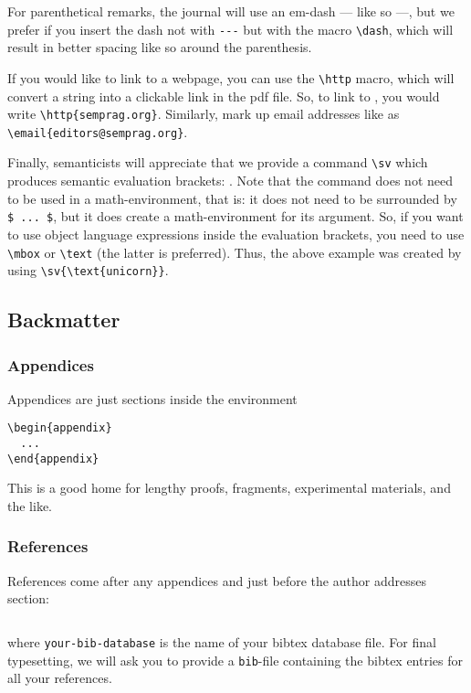 \documentclass[lucida,final]{sp}
\newcommand{\spfile}[1]{\texttt{#1}}
\newcommand{\spcode}[1]{\texttt{#1}}
\begin{document}
For parenthetical remarks, the journal will use an em-dash --- like so
---, but we prefer if you insert the dash not with \verb?---? but with
the macro \verb?\dash?, which will result in better spacing \dash like
so \dash around the parenthesis.

If you would like to link to a webpage, you can use the \verb?\http?
macro, which will convert a string into a clickable link in the pdf
file. So, to link to , you would write
\verb?\http{semprag.org}?. Similarly, mark up email addresses like
 as \verb?\email{editors@semprag.org}?.

Finally, semanticists will appreciate that we provide a command
\verb?\sv? which produces semantic evaluation brackets:
. Note that the command does not need to be used in
a math-environment, that is: it does not need to be surrounded by
\verb?$ ... $?, but it does create a math-environment for its
argument. So, if you want to use object language expressions inside
the evaluation brackets, you need to use \verb?\mbox? or \verb?\text?
(the latter is preferred). Thus, the above example was created by
using \verb?\sv{\text{unicorn}}?.


\subsection{Backmatter}

\subsubsection{Appendices}

Appendices are just sections inside the environment
%
\begin{Verbatim}
\begin{appendix}
  ...
\end{appendix}
\end{Verbatim}
%
This is a good home for lengthy proofs, fragments, experimental 
materials, and the like.


\subsubsection{References}\label{sec:refs}

References come after any appendices and just before the author
addresses section:
%
\begin{Verbatim}

\end{Verbatim}
%
where \spcode{your-bib-database} is the name of your bibtex database
file. For final typesetting, we will ask you to provide a
\spfile{bib}-file containing the bibtex entries for all your
references.
\end{document}
